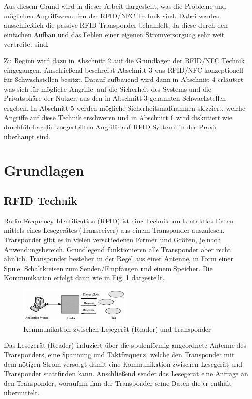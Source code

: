 \documentclass[conference]{IEEEtran}
\begin{document}
Aus diesem Grund wird in dieser Arbeit dargestellt, was die Probleme und möglichen Angriffsszenarien der RFID/NFC Technik sind. Dabei werden ausschließlich die passive RFID Transponder behandelt, da diese durch den einfachen Aufbau und das Fehlen einer eigenen Stromversorgung sehr weit verbreitet sind.

Zu Beginn wird dazu in Abschnitt 2 auf die Grundlagen der RFID/NFC Technik eingegangen. Anschließend beschreibt Abschnitt 3 was RFID/NFC konzeptionell für Schwachstellen besitzt. Darauf aufbauend wird dann in Abschnitt 4 erläutert was sich für mögliche Angriffe, auf die Sicherheit des Systems und die Privatsphäre der Nutzer, aus den in Abschnitt 3 genannten Schwachstellen ergeben. In Abschnitt 5 werden mögliche Sicherheitsmaßnahmen skizziert, welche Angriffe auf diese Technik erschweren und in Abschnitt 6 wird diskutiert wie durchführbar die vorgestellten Angriffe auf RFID Systeme in der Praxis überhaupt sind.

\section{Grundlagen}

\subsection{RFID Technik}
Radio Frequency Identification (RFID) ist eine Technik um kontaktlos Daten mittels eines Lesegerätes (Transceiver) aus einem Transponder auszulesen. Transponder gibt es in vielen verschiedenen Formen und Größen, je nach Anwendungsbereich. Grundlegend funktionieren alle Transponder aber recht ähnlich. Transponder bestehen in der Regel aus einer Antenne, in Form einer Spule, Schaltkreisen zum Senden/Empfangen und einem Speicher. Die Kommunikation erfolgt dann wie in Fig. \ref{fig1} dargestellt.

\begin{figure}[htbp]
\centerline{\includegraphics[width=0.5\textwidth]{img/kommunikation.png}}
\caption{Kommunikation zwischen Lesegerät (Reader) und Transponder \cite{b1}}
\label{fig1}
\end{figure}

Das Lesegerät (Reader) induziert über die spulenförmig angeordnete Antenne des Transponders, eine Spannung und Taktfrequenz, welche den Transponder mit dem nötigen Strom versorgt damit eine Kommunikation zwischen Lesegerät und Transponder stattfinden kann. Anschließend sendet das Lesegerät eine Anfrage an den Transponder, woraufhin ihm der Transponder seine Daten die er enthält übermittelt.
\end{document}

